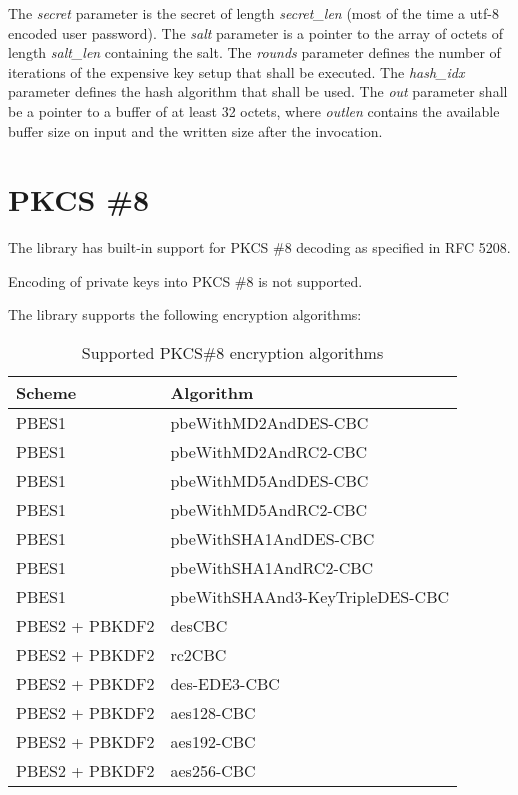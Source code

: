 \documentclass[synpaper]{book}
\newcommand{\mysection}[1]    %
	{                   %
	\section{#1}
   \markboth{\textsf{www.libtom.net}}{\thesection ~ {#1}}
	}
\begin{document}
The \textit{secret} parameter is the secret of length \textit{secret\_len} (most of the time a utf-8 encoded user password).
The \textit{salt} parameter is a pointer to the array of octets of length \textit{salt\_len} containing the salt.
The \textit{rounds} parameter defines the number of iterations of the expensive key setup that shall be executed.
The \textit{hash\_idx} parameter defines the hash algorithm that shall be used. 
The \textit{out} parameter shall be a pointer to a buffer of at least 32 octets,
where \textit{outlen} contains the available buffer size on input and the written size after the invocation.


\mysection{PKCS \#8}

The library has built-in support for PKCS \#8 decoding as specified in RFC 5208.

Encoding of private keys into PKCS \#8 is not supported.

The library supports the following encryption algorithms:

\begin{table}[H]
\begin{center}
\begin{tabular}{|l|l|}
      \hline \textbf{Scheme} & \textbf{Algorithm}              \\
      \hline PBES1           & pbeWithMD2AndDES-CBC            \\
      \hline PBES1           & pbeWithMD2AndRC2-CBC            \\
      \hline PBES1           & pbeWithMD5AndDES-CBC            \\
      \hline PBES1           & pbeWithMD5AndRC2-CBC            \\
      \hline PBES1           & pbeWithSHA1AndDES-CBC           \\
      \hline PBES1           & pbeWithSHA1AndRC2-CBC           \\
      \hline PBES1           & pbeWithSHAAnd3-KeyTripleDES-CBC \\
      \hline PBES2 + PBKDF2  & desCBC                          \\
      \hline PBES2 + PBKDF2  & rc2CBC                          \\
      \hline PBES2 + PBKDF2  & des-EDE3-CBC                    \\
      \hline PBES2 + PBKDF2  & aes128-CBC                      \\
      \hline PBES2 + PBKDF2  & aes192-CBC                      \\
      \hline PBES2 + PBKDF2  & aes256-CBC                      \\
      \hline
\end{tabular}
\caption{Supported PKCS\#8 encryption algorithms}
\end{center}
\label{fig:pkcs8}
\end{table}
\end{document}
